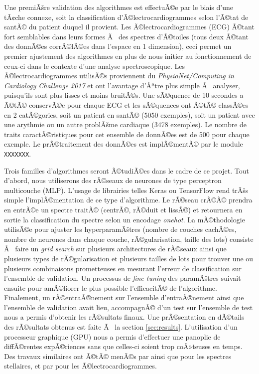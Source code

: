 \documentclass{article}
\begin{document}
Une premiÃšre validation des algorithmes est effectuÃ©e par le biais d'une tÃ¢che connexe, soit la classification d'Ã©lectrocardiogrammes selon l'Ã©tat de santÃ© du patient duquel il provient. Les Ã©lectrocardiogrammes (ECG) Ã©tant fort semblables dans leurs formes Ã  des spectres d'Ã©toiles (tous deux Ã©tant des donnÃ©es corrÃ©lÃ©es dans l'espace en 1 dimension), ceci permet un premier ajustement des algorithmes en plus de nous initier au fonctionnement de ceux-ci dans le contexte d'une analyse spectroscopique. Les Ã©lectrocardiogrammes utilisÃ©s proviennent du \textit{PhysioNet/Computing in Cardiology Challenge 2017} et ont l'avantage d'Ãªtre plus simple Ã  analyser, puisqu'ils sont plus lisses et moins bruitÃ©s. Une sÃ©quence de 10 secondes a Ã©tÃ© conservÃ©e pour chaque ECG et les sÃ©quences ont Ã©tÃ© classÃ©es en 2 catÃ©gories, soit un patient en santÃ© (5050 exemples), soit un patient avec une arythmie ou un autre problÃšme cardiaque (3478 exemples). Le nombre de traits caractÃ©ristiques pour cet ensemble de donnÃ©es est de 500 pour chaque exemple. Le prÃ©traitement des donnÃ©es est implÃ©mentÃ© par le module \texttt{XXXXXXX}.

Trois familles d'algorithmes seront Ã©tudiÃ©es dans le cadre de ce projet. Tout d'abord, nous utiliserons des rÃ©seaux de neurones de type perceptron multicouche (MLP). L'usage de librairies telles Keras ou TensorFlow rend trÃšs simple l'implÃ©mentation de ce type d'algorithme. Le rÃ©seau crÃ©Ã© prendra en entrÃ©e un spectre traitÃ© (centrÃ©, rÃ©duit et lissÃ©) et retournera en sortie la classification du spectre selon un encodage \textit{onehot}. La mÃ©thodologie utilisÃ©e pour ajuster les hyperparamÃštres (nombre de couches cachÃ©es, nombre de neurones dans chaque couche, rÃ©gularisation, taille des lots) consiste Ã  faire un \textit{grid search} sur plusieurs architectures de rÃ©seaux ainsi que plusieurs types de rÃ©gularisation et plusieurs tailles de lots pour trouver une ou plusieurs combinaisons prometteuses en mesurant l'erreur de classification sur l'ensemble de validation. Un processus de \textit{fine tuning} des paramÃštres suivait ensuite pour amÃ©liorer le plus possible l'efficacitÃ© de l'algorithme. Finalement, un rÃ©entraÃ®nement sur l'ensemble d'entraÃ®nement ainsi que l'ensemble de validation avait lieu, accompagnÃ© d'un test sur l'ensemble de test nous a permis d'obtenir les rÃ©sultats finaux. Une prÃ©sentation en dÃ©tails des rÃ©sultats obtenus est faite Ã  la section \ref{sec:results}. L'utilisation d'un processeur graphique (GPU) nous a permis d'effectuer une panoplie de diffÃ©rentes expÃ©riences sans que celles-ci soient trop coÃ»teuses en temps. Des travaux similaires ont Ã©tÃ© menÃ©s par \cite{bailer1998automated} ainsi que \cite{carricajo2004automatic} pour les spectres stellaires, et par \cite{shensheng2017deep} pour les Ã©lectrocardiogrammes.
\end{document}
